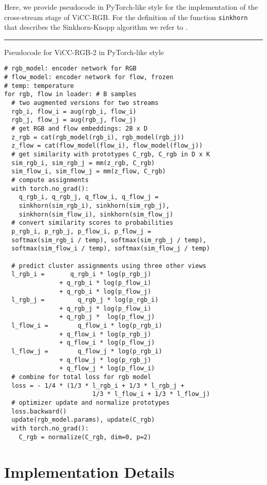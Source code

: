 \documentclass[10pt,twocolumn,letterpaper]{article}
\begin{document}
Here, we provide pseudocode in PyTorch-like style for the implementation of the cross-stream stage of ViCC-RGB. For the definition of the function \verb|sinkhorn| that describes the Sinkhorn-Knopp algorithm we refer to \cite{caron_unsupervised_2020}.
\begin{center}
\par\noindent\rule{\columnwidth}{0.5pt}
Pseudocode for ViCC-RGB-2 in PyTorch-like style 
\begin{lstlisting}[style=mystyle]
# rgb_model: encoder network for RGB
# flow_model: encoder network for flow, frozen
# temp: temperature
for rgb, flow in loader: # B samples
  # two augmented versions for two streams
  rgb_i, flow_i = aug(rgb_i, flow_i)
  rgb_j, flow_j = aug(rgb_j, flow_j)
  # get RGB and flow embeddings: 2B x D
  z_rgb = cat(rgb_model(rgb_i), rgb_model(rgb_j)) 
  z_flow = cat(flow_model(flow_i), flow_model(flow_j))
  # get similarity with prototypes C_rgb, C_rgb in D x K
  sim_rgb_i, sim_rgb_j = mm(z_rgb, C_rgb) 
  sim_flow_i, sim_flow_j = mm(z_flow, C_rgb) 
  # compute assignments 
  with torch.no_grad():
    q_rgb_i, q_rgb_j, q_flow_i, q_flow_j = 
    sinkhorn(sim_rgb_i), sinkhorn(sim_rgb_j), 
    sinkhorn(sim_flow_i), sinkhorn(sim_flow_j) 
  # convert similarity scores to probabilities 
  p_rgb_i, p_rgb_j, p_flow_i, p_flow_j = 
  softmax(sim_rgb_i / temp), softmax(sim_rgb_j / temp), 
  softmax(sim_flow_i / temp), softmax(sim_flow_j / temp)
  
  # predict cluster assignments using three other views
  l_rgb_i =       q_rgb_i * log(p_rgb_j) 
               + q_rgb_i * log(p_flow_i) 
               + q_rgb_i * log(p_flow_j) 
  l_rgb_j =         q_rgb_j * log(p_rgb_i) 
               + q_rgb_j * log(p_flow_i) 
               + q_rgb_j *  log(p_flow_j)
  l_flow_i =        q_flow_i * log(p_rgb_i) 
               + q_flow_i * log(p_rgb_j)  
               + q_flow_i * log(p_flow_j)
  l_flow_j =        q_flow_j * log(p_rgb_i) 
               + q_flow_j * log(p_rgb_j)  
               + q_flow_j * log(p_flow_i)
  # combine for total loss for rgb model
  loss = - 1/4 * (1/3 * l_rgb_i + 1/3 * l_rgb_j + 
                        1/3 * l_flow_i + 1/3 * l_flow_j) 
  # optimizer update and normalize prototypes
  loss.backward()
  update(rgb_model.params), update(C_rgb)
  with torch.no_grad():
    C_rgb = normalize(C_rgb, dim=0, p=2)
\end{lstlisting}
\end{center}


\section{Implementation Details}
\end{document}
